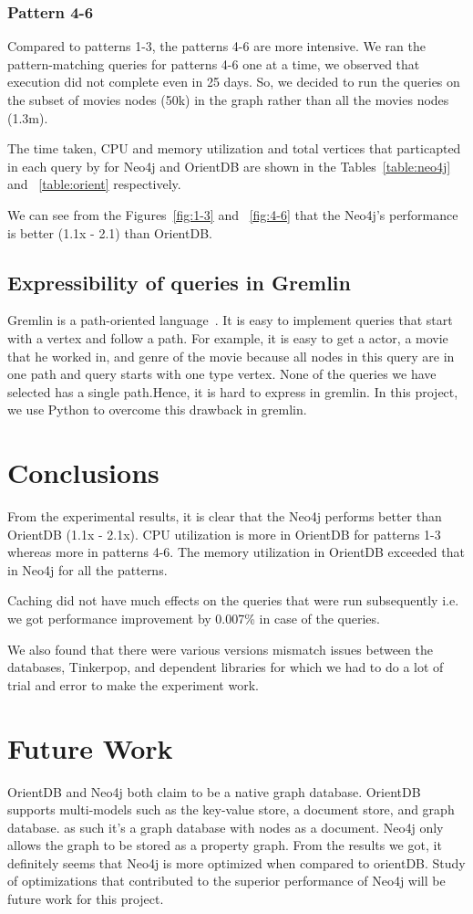 \subsubsection{Pattern 4-6}

Compared to patterns 1-3, the patterns 4-6 are more intensive. We ran the pattern-matching queries for patterns 4-6 one at a time, we observed that execution did not complete even in 25 days. So, we decided to run the queries on the subset of movies nodes (50k) in the graph rather than all the movies nodes (1.3m). 

The time taken, CPU and memory utilization and total vertices that particapted in each query by for Neo4j and OrientDB are shown in the Tables~\ref{table:neo4j} and ~\ref{table:orient} respectively.

We can see from the Figures~\ref{fig:1-3} and ~\ref{fig:4-6} that the Neo4j's performance is better (1.1x - 2.1) than OrientDB.

\subsection{Expressibility of queries in Gremlin}

Gremlin is a path-oriented language~\cite{Chapter635:online}. It is easy to implement queries that start with a vertex and follow a path. For example, it is easy to get a actor, a movie that he worked in, and genre of the movie because all nodes in this query are in one path and query starts with one type vertex. None of the queries we have selected has a single path.Hence, it is hard to express in gremlin.
In this project, we use Python to overcome this drawback in gremlin. 

\section{Conclusions}
From the experimental results, it is clear that the Neo4j performs better than OrientDB (1.1x - 2.1x). CPU utilization is more in OrientDB  for patterns 1-3 whereas more in patterns 4-6. The memory utilization in OrientDB exceeded that in Neo4j for all the patterns.

Caching did not have much effects on the queries that were run subsequently i.e. we got performance improvement by 0.007\% in case of the queries.

We also found that there were various versions mismatch issues between the databases, Tinkerpop, and dependent libraries for which we had to do a lot of trial and error to make the experiment work.

\section{Future Work}
OrientDB and Neo4j both claim to be a native graph database. OrientDB supports multi-models such as the key-value store, a document store, and graph database. as such it's a graph database with nodes as a document. Neo4j only allows the graph to be stored as a property graph. From the results we got, it definitely seems that Neo4j is more optimized when compared to orientDB. Study of optimizations that contributed to the superior performance of Neo4j will be future work for this project.